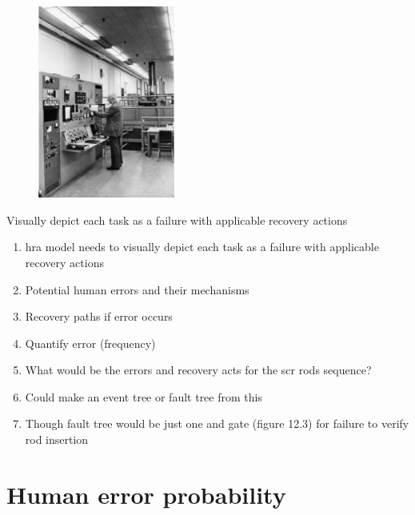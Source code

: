 \documentclass[aspectratio=1610,pdftex,dvipsnames,compress,xcolor={dvipsnames}]{beamer}
\newcommand{\acs}{\acrshort} %
\begin{document}
\begin{frame}{}
    \begin{figure}
        \centering
        \includegraphics[width=0.40\textwidth]{wpi.reactor2.jpg}
    \end{figure}
\end{frame}


\begin{frame}{Visually depict each task as a failure with applicable recovery actions}
    \begin{enumerate}[series=outerlist,topsep=0pt,itemsep=18pt,leftmargin=*,label=(\arabic*)]
        \item[]\acs{hra} model needs to visually depict each task as a failure with applicable recovery actions
        \item[]Potential human errors and their mechanisms
        \item[]Recovery paths if error occurs
        \item[]Quantify error (frequency)
        \item[]What would be the errors and recovery acts for the \acs{scr} rods sequence? 
        \item[]Could make an event tree or fault tree from this
        \item[]Though fault tree would be just one and gate (figure 12.3) for failure to verify rod insertion
    \end{enumerate}
\end{frame}


\section{Human error probability}
\end{document}
